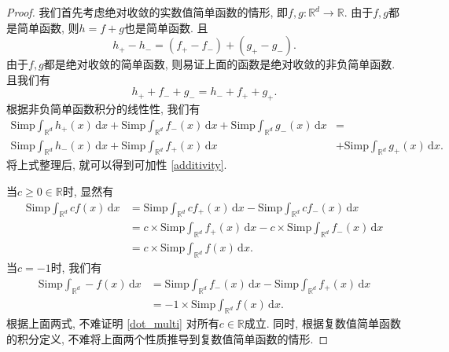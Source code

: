 \documentclass[reqno,a4paper,10pt]{amsart}
\newcommand\dif{\,\mathrm{d}}
\begin{document}
\begin{proof}
    我们首先考虑绝对收敛的实数值简单函数的情形, 即$f,g: \mathbb{R}^d\to \mathbb{R}$. 由于$f,g$都是简单函数, 则$h=f+g$也是简单函数. 且
    \begin{equation*}
        h_+ - h_-=(f_+ - f_-)+(g_+ - g_-).
    \end{equation*}
    由于$f,g$都是绝对收敛的简单函数, 则易证上面的函数是绝对收敛的非负简单函数. 且我们有
    \begin{equation}
        h_+ + f_- + g_- = h_- + f_+ + g_+.
        \label{equivalence}
    \end{equation}
    根据非负简单函数积分的线性性, 我们有
    \begin{equation*}
        \begin{split}
            \mathrm{Simp}\int_{\mathbb{R}^d} h_+(x)\dif x + \mathrm{Simp}\int_{\mathbb{R}^d} f_-(x)\dif x +\mathrm{Simp}\int_{\mathbb{R}^d} g_-(x)\dif x &=\\
            \mathrm{Simp}\int_{\mathbb{R}^d} h_-(x)\dif x + \mathrm{Simp}\int_{\mathbb{R}^d} f_+(x)\dif x &+ \mathrm{Simp}\int_{\mathbb{R}^d} g_+(x)\dif x.
        \end{split}
    \end{equation*}
    将上式整理后, 就可以得到可加性 \eqref{additivity}. 
    
    当$c\geq 0\in\mathbb{R}$时, 显然有
    \begin{equation*}
        \begin{split}
            \mathrm{Simp}\int_{\mathbb{R}^d} c f(x)\dif x &= \mathrm{Simp}\int_{\mathbb{R}^d} c f_+(x)\dif x -\mathrm{Simp}\int_{\mathbb{R}^d} c f_-(x)\dif x\\
            &=c\times\mathrm{Simp} \int_{\mathbb{R}^d} f_+(x)\dif x - c\times\mathrm{Simp} \int_{\mathbb{R}^d} f_-(x)\dif x\\
            &=c\times\mathrm{Simp} \int_{\mathbb{R}^d} f(x)\dif x.
        \end{split}
    \end{equation*}
    当$c=-1$时, 我们有
    \begin{equation*}
        \begin{split}
            \mathrm{Simp}\int_{\mathbb{R}^d} - f(x)\dif x &= \mathrm{Simp}\int_{\mathbb{R}^d}  f_-(x)\dif x -\mathrm{Simp}\int_{\mathbb{R}^d}  f_+(x)\dif x\\
            &=-1\times\mathrm{Simp} \int_{\mathbb{R}^d} f(x)\dif x.
        \end{split}
    \end{equation*}
    根据上面两式, 不难证明 \eqref{dot_multi} 对所有$c\in \mathbb{R}$成立. 同时, 根据复数值简单函数的积分定义, 不难将上面两个性质推导到复数值简单函数的情形. 


\end{proof}
\end{document}
